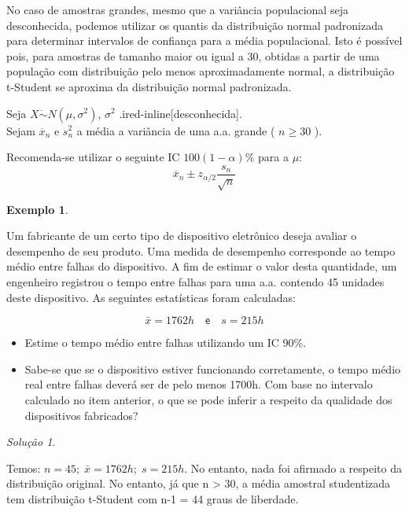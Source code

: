 \documentclass[
]{book}
\providecommand{\tightlist}{%
  \setlength{\itemsep}{0pt}\setlength{\parskip}{0pt}}
\theoremstyle{definition}
\theoremstyle{definition}
\newtheorem{example}{Exemplo}[chapter]
\theoremstyle{definition}
\theoremstyle{remark}
\newtheorem*{solution}{Solução}
\begin{document}
No caso de amostras grandes, mesmo que a variância populacional seja desconhecida, podemos utilizar os quantis da distribuição normal padronizada para determinar intervalos de confiança para a média populacional. Isto é possível pois, para amostras de tamanho maior ou igual a 30, obtidas a partir de uma população com distribuição pelo menos aproximadamente normal, a distribuição t-Student se aproxima da distribuição normal padronizada.

Seja
\(X \dot{\sim} N(\mu, \sigma^2)\), \(\sigma^2\) .ired-inline{[}desconhecida{]}.\\
Sejam \(\overline{x}_n\) e \(s_n^2\) a média a variância de uma a.a. grande ( \(n \geq 30\) ).

Recomenda-se utilizar o seguinte IC \(100(1-\alpha)\%\) para a \(\mu\):
\[\overline{x}_n \pm z_{\alpha/2} \frac{{s_n}}{\sqrt{n}}\]

\begin{example}
\protect\hypertarget{exm:unnamed-chunk-6}{}{\label{exm:unnamed-chunk-6} }
\end{example}

Um fabricante de um certo tipo de dispositivo eletrônico deseja avaliar o desempenho de seu produto. Uma medida de desempenho corresponde ao tempo médio entre falhas do dispositivo. A fim de estimar o valor desta quantidade, um engenheiro registrou o tempo entre falhas para uma a.a. contendo 45 unidades deste dispositivo. As seguintes estatísticas foram calculadas:

\[\bar{x} = 1762 h \quad \textsf{e} \quad s = 215h\]

\begin{itemize}
\tightlist
\item
  Estime o tempo médio entre falhas utilizando um IC 90\%.\\
\item
  Sabe-se que se o dispositivo estiver funcionando corretamente, o tempo médio real entre falhas deverá ser de pelo menos 1700h. Com base no intervalo calculado no item anterior, o que se pode inferir a respeito da qualidade dos dispositivos fabricados?
\end{itemize}

\begin{solution}
{}
\end{solution}

Temos: \(n = 45; \; \bar{x} = 1762h; \; s = 215h\). No entanto, nada foi afirmado a respeito da distribuição original. No entanto, já que n \textgreater{} 30, a média amostral studentizada tem distribuição t-Student com n-1 = 44 graus de liberdade.
\end{document}
